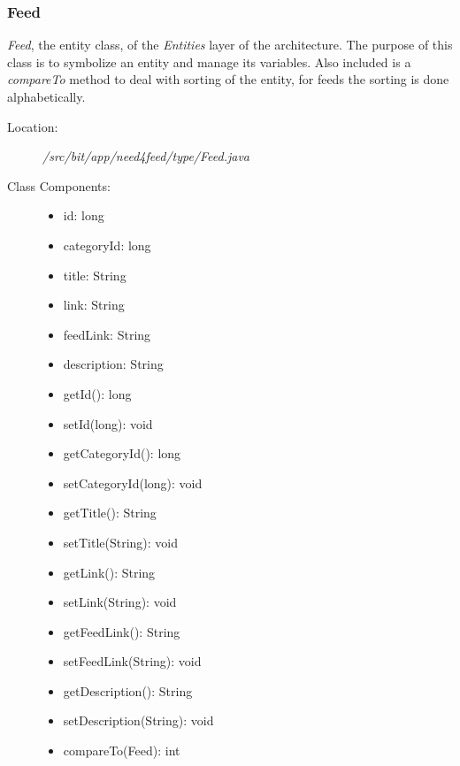 \subsubsection{Feed}
\textit{Feed}, the entity class, of the \textit{Entities} layer of the architecture. The purpose of this class is to symbolize an entity and manage its variables. Also included is a \textit{compareTo} method to deal with sorting of the entity, for feeds the sorting is done alphabetically.
\begin{description}
  \item[Location:] \textit{/src/bit/app/need4feed/type/Feed.java} \hfill
  \item[Class Components:] \hfill
     \begin{itemize}
        \item id: long
        \item categoryId: long
        \item title: String
        \item link: String
        \item feedLink: String
        \item description: String
		\item getId(): long 
		\item setId(long): void
		\item getCategoryId(): long 
		\item setCategoryId(long): void
		\item getTitle(): String 
		\item setTitle(String): void
		\item getLink(): String 
		\item setLink(String): void
		\item getFeedLink(): String 
		\item setFeedLink(String): void
		\item getDescription(): String 
		\item setDescription(String): void
		\item compareTo(Feed): int
     \end{itemize}
\end{description}


